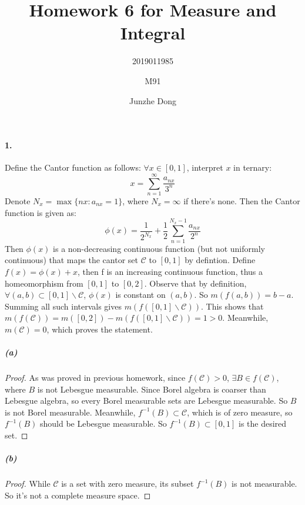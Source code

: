 \documentclass{article}
\author{2019011985\and M91\and Junzhe Dong}
\title{Homework 6 for Measure and Integral}
\begin{document}
\maketitle
\newcommand{\st}{\text{ s.t.}}
\newcommand{\dd}{\,\mathrm{d}}
\newcommand{\du}{\,\mathrm{d} \mu}
\newcommand{\re}{\mathrm{Re}\,}
\newcommand{\im}{\mathrm{Im}\,}
\newcommand{\sip}{\mathrm{Simp}}
\newcommand{\R}{\mathbf{R}^d}
\newcommand{\WLOG}{without loss of generality}
\newcommand{\aeeq}{\stackrel{\mathrm{a.e.}}{=}}
\newcommand{\B}{\mathcal{B}}
\newcommand{\F}{\mathcal{F}}

\DeclareRobustCommand{\rchi}{{\mathpalette\irchi\relax}}
\newcommand{\irchi}[2]{\raisebox{\depth}{$#1\chi$}} 

\paragraph{1.}
Define the Cantor function as follows: $\forall x\in [0,1]$, interpret $x$ in ternary:
\[x=\sum_{n=1}^{\infty}\frac{a_{nx}}{3^n}\]
Denote $N_x=\max\{nx:a_{nx}=1\}$, where $N_x=\infty$ if there's none. Then the Cantor function is given as:
\[\phi(x)=\frac{1}{2^{N_x}}+\frac{1}{2}\sum_{n=1}^{N_x-1}\frac{a_{nx}}{2^n}\]
Then $\phi(x)$ is a non-decreasing continuous function (but not uniformly continuous) that maps the cantor set $\mathcal{C}$ to $[0,1]$ by defintion. Define $f(x)=\phi(x)+x$, then f is an increasing continuous function, thus a homeomorphism from $[0,1]$ to $[0,2]$. 
Observe that by definition, $\forall (a,b)\subset [0,1]\backslash \mathcal{C}$, $\phi(x)$ is constant on $(a,b)$. So $m(f(a,b))=b-a$. Summing all such intervals gives $m(f([0,1]\backslash \mathcal{C}))$. This shows that $m(f(\mathcal{C}))=m([0,2])-m(f([0,1]\backslash \mathcal{C}))=1>0$. Meanwhile, $m(\mathcal{C})=0$, which proves the statement. 
\subparagraph{(a)}
\begin{proof}
As was proved in previous homework, since $f(\mathcal{C})>0$, $\exists B\in f(\mathcal{C})$, where $B$ is not Lebesgue measurable. Since Borel algebra is coarser than Lebesgue algebra, so every Borel measurable sets are Lebesgue measurable. So $B$ is not Borel measurable. Meanwhile, $f^{-1}(B)\subset \mathcal{C}$, which is of zero measure, so $f^{-1}(B)$ should be Lebesgue measurable. So $f^{-1}(B)\subset [0,1]$ is the desired set.
\end{proof}
\subparagraph{(b)}
\begin{proof}
While $\mathcal{C}$ is a set with zero measure, its subset $f^{-1}(B)$ is not measurable. So it's not a complete measure space.
\end{proof}
\end{document}
